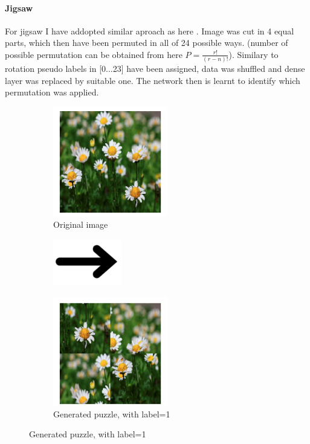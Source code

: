 \documentclass[12pt]{extarticle}
\begin{document}
\paragraph{Jigsaw}
For jigsaw I have addopted similar aproach as here \cite{DBLP:journals/corr/NorooziF16}. 
Image was cut in 4 equal parts, which then have been permuted in all of 24 possible ways. 
(number of possible permutation can be obtained from here $P=\frac{r!}{(r-n)!}$).
Similary to rotation pseudo labels in [0...23] have been assigned, data was shuffled and dense layer was replaced by suitable one.
The network then is learnt to identify which permutation was applied. 

\begin{figure}[!h]
  \begin{subfigure}{0.33\textwidth}
    \caption{Original image}
    \includegraphics[width=5cm]{images/dandelion.png}
  \end{subfigure}
  \begin{subfigure}{0.2\textwidth}
    \includegraphics[width=3cm]{images/arrow.png}
   \end{subfigure}
  \begin{subfigure}{0.33\textwidth}
    \caption{Generated puzzle, with label=1}
    \includegraphics[width=5cm]{images/puzzle.png}
   \end{subfigure}
\end{figure}
\end{document}
